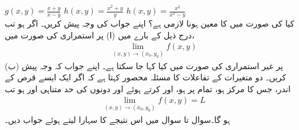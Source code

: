 $g(x,y)=\frac{x+y}{x-y}$
$h(x,y)=\frac{x^2+y}{y}$
$h(x,y)=\frac{x^2}{x^2-y}$
\\
کیا   کی صورت میں  کا معین ہونا لازمی ہے؟ اپنے جواب کی وجہ پیش کریں۔
اگر  ہو تب درج ذیل کے بارے میں  (ا)    پر استمراری  کی صورت میں،
\begin{align*}
\lim_{(x,y)\to(x_0,y_0)} f(x,y)
\end{align*}
(ب)   پر غیر استمراری  کی صورت میں کیا کہا جا  سکتا ہے۔ اپنے جواب کہ وجہ پیش کریں۔
دو متغیرات کے تفاعلات  کا مسئلہ محصور  کہتا ہے کہ اگر ایک ایسے  قرص کے اندر،  جس کا  مرکز   ہو،  تمام  پر  ہو،  اور  کرتے ہوئے   اور  دونوں کی حد  متناہی اور  ہو   تب
\begin{align*}
\lim_{(x,y)\to(x_0,y_0)}f(x,y)=L
\end{align*}
ہو گا۔سوال  تا سوال  میں  اس نتیجے   کا سہارا لیتے ہوئے جواب دیں۔ 

